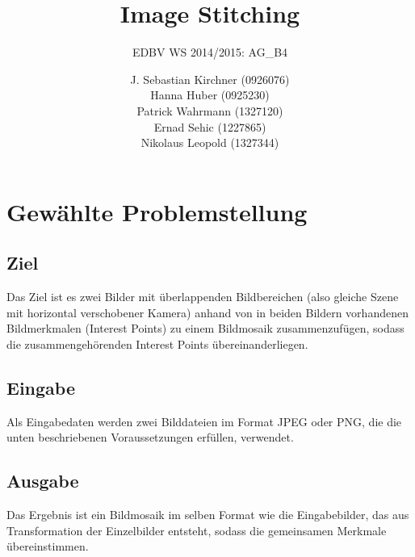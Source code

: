\documentclass[deutsch]{scrartcl}
\begin{document}
\title{Image Stitching} 

\subtitle{EDBV WS 2014/2015: AG\_B4} 

\author{J. Sebastian Kirchner (0926076)\\
	Hanna Huber (0925230)\\
	Patrick Wahrmann (1327120)\\
	Ernad Sehic (1227865)\\
	Nikolaus Leopold (1327344)}


\maketitle

\section{Gewählte Problemstellung}
\subsection{Ziel}
Das Ziel ist es zwei Bilder mit überlappenden Bildbereichen (also gleiche Szene mit horizontal verschobener Kamera) anhand von in beiden Bildern vorhandenen Bildmerkmalen (Interest Points) zu einem Bildmosaik zusammenzufügen, sodass die zusammengehörenden Interest Points übereinanderliegen.

\subsection{Eingabe}
Als Eingabedaten werden zwei Bilddateien im Format JPEG oder PNG, die die unten beschriebenen Voraussetzungen erfüllen, verwendet.

\subsection{Ausgabe}
Das Ergebnis ist ein Bildmosaik im selben Format wie die Eingabebilder, das aus Transformation der Einzelbilder entsteht, sodass die gemeinsamen Merkmale übereinstimmen.
\end{document}
